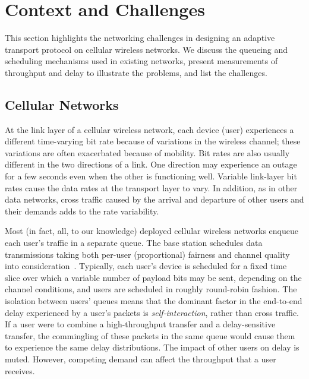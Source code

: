 \section{Context and Challenges}
\label{s:problem}

This section highlights the networking challenges in designing an
adaptive transport protocol on cellular wireless networks. We discuss
the queueing and scheduling mechanisms used in existing networks,
present measurements of throughput and delay to illustrate the
problems, and list the challenges.

\subsection{Cellular Networks}

At the link layer of a cellular wireless network, each device (user)
experiences a different time-varying bit rate because of variations in
the wireless channel; these variations are often exacerbated because of
mobility. Bit rates are also usually different in the two directions
of a link. One direction may experience an outage for a few seconds
even when the other is functioning well. Variable link-layer bit rates
cause the data rates at the transport layer to vary. In addition, as
in other data networks, cross traffic caused by the arrival and
departure of other users and their demands adds to the rate
variability.

Most (in fact, all, to our knowledge) deployed cellular wireless
networks enqueue each user's traffic in a separate queue. The base
station schedules data transmissions taking both per-user
(proportional) fairness and channel quality into
consideration~\cite{propfair}. Typically, each user's device is
scheduled for a fixed time slice over which a variable number of
payload bits may be sent, depending on the channel conditions, and
users are scheduled in roughly round-robin fashion. The isolation
between users' queues means that the dominant factor in the end-to-end
delay experienced by a user's packets is {\em self-interaction},
rather than cross traffic. If a user were to combine a high-throughput
transfer and a delay-sensitive transfer, the commingling of these
packets in the same queue would cause them to experience the same
delay distributions. The impact of other users on delay is
muted. However, competing demand can affect the throughput that a user
receives.

